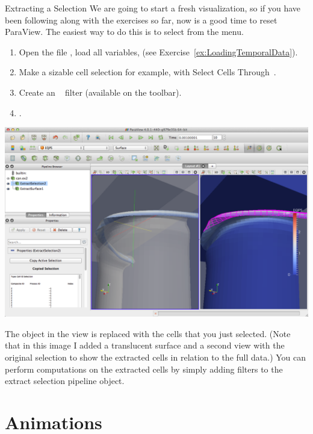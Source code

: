 \begin{exercise}{Extracting a Selection}
  \label{ex:ExtractingASelection}%
  We are going to start a fresh visualization, so if you have been
  following along with the exercises so far, now is a good time to reset
  ParaView.  The easiest way to do this is to select  \ra
   from the menu.

  \begin{enumerate}
  \item Open the file , load all variables, \apply (see
    Exercise~\ref{ex:LoadingTemporalData}).
  \item Make a sizable cell selection for example, with Select Cells
    Through~\selectCellsThrough.
  \item Create an ~\extractSelection
    filter (available on the toolbar).
  \item \apply.
  \end{enumerate}

  \begin{inlinefig}
    \includegraphics[width=\scw]{images/ExtractSelection}
  \end{inlinefig}

  The object in the view is replaced with the cells that you just
  selected. (Note that in this image I added a translucent surface and a
  second view with the original selection to show the extracted cells in
  relation to the full data.) You can perform computations on the extracted
  cells by simply adding filters to the extract selection pipeline object.
\end{exercise}


\section{Animations}
\label{sec:Animations}

